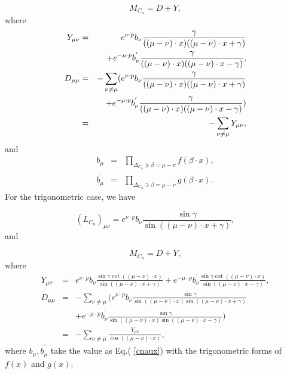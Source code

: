 \documentclass[a4paper,12pt]{article}
\begin{document}
\begin{equation}
M_{C_{n}}=D+Y,	\label{Mmatrix}
\end{equation}
where
\begin{eqnarray}
Y_{\mu \nu } &=&e^{\nu \cdot p}b_{\nu }\frac{\gamma }{((\mu -\nu )\cdot
x)((\mu -\nu )\cdot x+\gamma )}	 \nonumber \\
&&+e^{-\mu \cdot p}b_{\nu }^{^{\prime }}\frac{\gamma }{((\mu -\nu )\cdot
x)((\mu -\nu )\cdot x-\gamma )},  \label{ratiY} \\
D_{\mu \mu } &=&-\sum_{\nu \neq \mu }(e^{\nu \cdot p}b_{\nu }\frac{\gamma }{%
((\mu -\nu )\cdot x)((\mu -\nu )\cdot x+\gamma )}  \nonumber \\
&&+e^{-\mu \cdot p}b_{\nu }^{^{\prime }}\frac{\gamma }{((\mu -\nu )\cdot
x)((\mu -\nu )\cdot x-\gamma )})  \nonumber \\
&=&-\sum_{\nu \neq \mu }Y_{\mu \nu },  \label{ratiD}
\end{eqnarray}
and
\begin{eqnarray}
b_{\mu } &=&\prod_{\Delta _{C_{n}}\ni \beta =\mu -\nu }f(\beta \cdot x),
\nonumber \\
b_{\mu }^{^{\prime }} &=&\prod_{\Delta _{C_{n}}\ni \beta =\mu -\nu }g(\beta
\cdot x).  \label{cnaux}
\end{eqnarray}
For the trigonometric case, we have

\begin{equation}
(L_{C_{n}})_{\mu \nu }=e^{\nu \cdot p}b_{\nu }\frac{\sin \gamma }{\sin ((\mu
-\nu )\cdot x+\gamma )},  \label{trigL}
\end{equation}
and

\begin{equation}
M_{C_{n}}=D+Y,	\label{trigM}
\end{equation}
where
\begin{eqnarray}
Y_{\mu \nu } &=&e^{\nu \cdot p}b_{\nu }\frac{\sin \gamma \cot ((\mu -\nu
)\cdot x)}{\sin ((\mu -\nu )\cdot x+\gamma )}+e^{-\mu \cdot p}b_{\nu
}^{^{\prime }}\frac{\sin \gamma \cot ((\mu -\nu )\cdot x)}{\sin ((\mu -\nu
)\cdot x-\gamma )},  \label{trigY} \\
D_{\mu \mu } &=&-\sum_{\nu \neq \mu }(e^{\nu \cdot p}b_{\nu }\frac{\sin
\gamma }{\sin ((\mu -\nu )\cdot x)\sin ((\mu -\nu )\cdot x+\gamma )}
\nonumber \\
&&+e^{-\mu \cdot p}b_{\nu }^{^{\prime }}\frac{\sin \gamma }{\sin ((\mu -\nu
)\cdot x)\sin ((\mu -\nu )\cdot x-\gamma )})  \nonumber \\
&=&-\sum_{\nu \neq \mu }\frac{Y_{\mu \nu }}{\cos ((\mu -\nu )\cdot x)},
\label{trigD}
\end{eqnarray}
where $b_{\mu },b_{\mu }^{^{\prime }}$ take the value as Eq.( \ref{cnaux})
with the trigonometric forms of $f(x)$ and $g(x)$.
\end{document}
